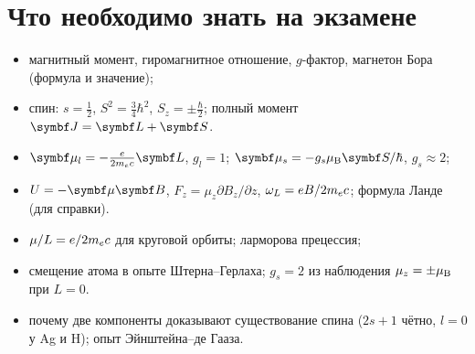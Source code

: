 \section{Что необходимо знать на экзамене}

\begin{examcheck}
\begin{itemize}
 \item магнитный момент, гиромагнитное отношение, $g$-фактор, магнетон Бора (формула и значение);
 \item спин: $s=\frac12$, $S^2=\frac34\hbar^2$, $S_z=\pm\frac\hbar2$; полный момент $\vect J=\vect L+\vect S$.
\end{itemize}
\begin{itemize}
 \item $\vect\mu_l=-\frac{e}{2\mel c}\vect L$, $g_l=1$; $\vect\mu_s=-g_s\muB\vect S/\hbar$, $g_s\approx2$;
 \item $U=-\vect\mu\vect B$, $F_z=\mu_z\partial B_z/\partial z$, $\omega_L=eB/2m_e c$; формула Ланде (для справки).
\end{itemize}
\begin{itemize}
 \item $\mu/L=e/2m_e c$ для круговой орбиты; ларморова прецессия;
 \item смещение атома в опыте Штерна--Герлаха; $g_s=2$ из наблюдения $\mu_z=\pm\mu_{\mathrm B}$ при $L=0$.
\end{itemize}
\begin{itemize}
 \item почему две компоненты доказывают существование спина ($2s+1$ чётно, $l=0$ у Ag и H); опыт Эйнштейна--де Гааза.
\end{itemize}
\end{examcheck}
